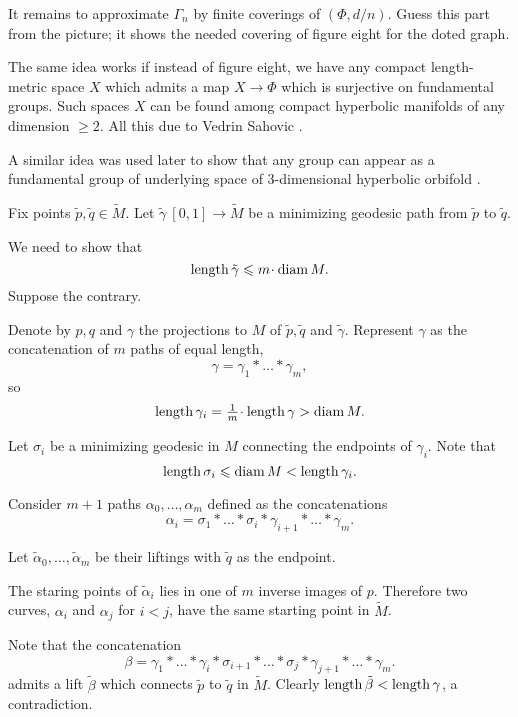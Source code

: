 It remains to approximate $\Gamma_n$ by finite coverings of $(\Phi,d/n)$.
Guess this part from the picture; 
it shows the needed covering of figure eight for the doted graph.\qeds


The same idea works if instead of figure eight, we have any compact length-metric space $X$ which admits a map $X\to\Phi$
which is surjective on fundamental groups.
Such spaces $X$ can be found among compact hyperbolic manifolds of any dimension $\ge 2$.
All this due to Vedrin Sahovic \cite[see][]{sahovic}.

A similar idea was used later to show that any group can appear as a fundamental group of underlying space of 3-dimensional hyperbolic orbifold \cite[see][]{panov-petrunin-telescopic}.





Fix points $\tilde p,\tilde q\in\tilde M$.
Let  
$\tilde\gamma\:[0,1]\to \tilde M$ be a minimizing geodesic path from $\tilde p$ to $\tilde q$. 

We need to show that 
\[\length \tilde\gamma\le m\cdot \diam M.\]
Suppose the contrary.

Denote by $p,q$ and $\gamma$ the projections to $M$ of $\tilde p,\tilde q$ and $\tilde \gamma$. 
Represent $\gamma$
as the concatenation of $m$ paths of equal length,
\[\gamma=\gamma_1{*}\dots{*}\gamma_m,\] 
so
\[\length\gamma_i=\tfrac{1}m\cdot\length\gamma>\diam M.\] 

Let $\sigma_i$ be a minimizing geodesic in $M$ connecting the endpoints of $\gamma_i$. 
Note that 
\[\operatorname{\rm length}\sigma_i\leqslant \operatorname{\rm diam}\nolimits M< \operatorname{\rm length}\gamma_i.\] 

Consider $m+1$ paths $\alpha_0,\dots,\alpha_m$ defined as the concatenations 
\[\alpha_i=\sigma_1{*}\dots{*}\sigma_i{*}\gamma_{i+1}{*}\dots{*}\gamma_m.\]

Let $\tilde\alpha_0,\dots,\tilde\alpha_m$ be their liftings
with $\tilde q$ as the endpoint.

The staring points of $\tilde\alpha_i$ lies in one of $m$ inverse images of $p$. 
Therefore two curves, $\alpha_i$ and $\alpha_j$ for $i<j$, 
have the same starting point in $\tilde M$.

Note that the concatenation
\[\beta=\gamma_1{*}\dots{*}\gamma_i{*}\sigma_{i+1}{*}\dots{*}\sigma_j{*}\gamma_{j+1}{*}\dots{*}\gamma_m.\]
admits a lift $\tilde\beta$ 
which connects $\tilde p$ to $\tilde q$ in $\tilde M$.
Clearly $\operatorname{\rm length} \tilde\beta<\operatorname{\rm length} \gamma$, a contradiction.
\qeds

